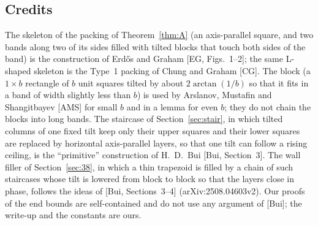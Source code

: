 \documentclass[11pt]{amsart}
\theoremstyle{definition}
\theoremstyle{remark}
\numberwithin{equation}{section}
\begin{document}
\subsection{Credits}\label{ssec:credit}
The skeleton of the packing of Theorem~\ref{thm:A} (an axis-parallel square, and two bands along two of its sides
filled with tilted blocks that touch both sides of the band) is the construction of Erd\H{o}s and Graham [EG,
Figs.~1--2]; the same L-shaped skeleton is the Type~1 packing of Chung and Graham [CG]. The block (a $1\times b$
rectangle of $b$ unit squares tilted by about $2\arctan(1/b)$ so that it fits in a band of width slightly less than $b$)
is used by Arslanov, Mustafin and Shangitbayev [AMS] for small $b$ and in a lemma for even $b$; they do not chain the
blocks into long bands. The staircase of Section~\ref{sec:stair}, in which tilted columns of one fixed tilt keep only
their upper squares and their lower squares are replaced by horizontal axis-parallel layers, so that one tilt can
follow a rising ceiling, is the ``primitive'' construction of H.~D.~Bui [Bui, Section~3]. The wall filler of
Section~\ref{sec:38}, in which a thin trapezoid is filled by a chain of such staircases whose tilt is lowered from block
to block so that the layers close in phase, follows the ideas of [Bui, Sections~3--4] (arXiv:2508.04603v2). Our proofs
of the end bounds are self-contained and do not use any argument of [Bui]; the write-up and the constants are ours.
\end{document}
